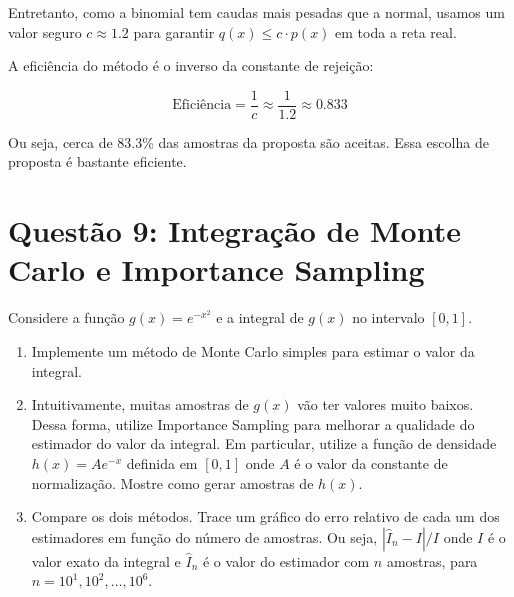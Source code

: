 \documentclass[12 pt]{article}
\begin{document}
\begin{enumerate}
\begin{tcolorbox}[colframe=black, title=Resposta:]
        Entretanto, como a binomial tem caudas mais pesadas que a normal, usamos um valor seguro $c \approx 1.2$ para garantir $q(x) \leq c \cdot p(x)$ em toda a reta real.
        
        A eficiência do método é o inverso da constante de rejeição:
        
        $$
        \text{Eficiência} = \frac{1}{c} \approx \frac{1}{1.2} \approx 0.833
        $$
        
        Ou seja, cerca de 83.3\% das amostras da proposta são aceitas. Essa escolha de proposta é bastante eficiente.
    \end{tcolorbox}            
\end{enumerate}

\section*{Questão 9: Integração de Monte Carlo e Importance Sampling}

Considere a função $g(x) = e^{-x^2}$ e a integral de $g(x)$ no intervalo $[0, 1]$.

\begin{enumerate}
    \item Implemente um método de Monte Carlo simples para estimar o valor da integral.
    \begin{tcolorbox}[colframe=black, title=Resposta:]

    \end{tcolorbox}
    \item Intuitivamente, muitas amostras de $g(x)$ vão ter valores muito baixos. Dessa forma, utilize Importance Sampling para melhorar a qualidade do estimador do valor da integral. Em particular, utilize a função de densidade $h(x) = Ae^{-x}$ definida em $[0, 1]$ onde $A$ é o valor da constante de normalização. Mostre como gerar amostras de $h(x)$.
    \begin{tcolorbox}[colframe=black, title=Resposta:]

    \end{tcolorbox}
    \item Compare os dois métodos. Trace um gráfico do erro relativo de cada um dos estimadores em função do número de amostras. Ou seja, $|\hat{I}_n - I|/I$ onde $I$ é o valor exato da integral e $\hat{I}_n$ é o valor do estimador com $n$ amostras, para $n = 10^1, 10^2, \dots, 10^6$.
    \begin{tcolorbox}[colframe=black, title=Resposta:]

    \end{tcolorbox}
\end{enumerate}
\end{document}
